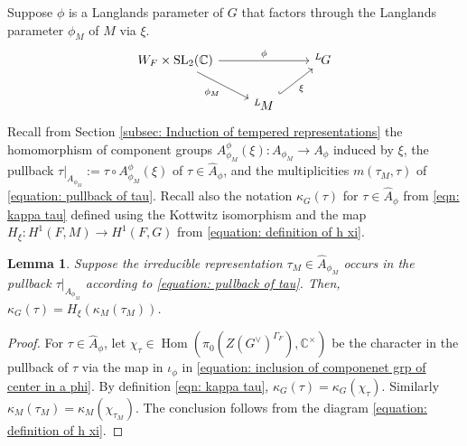 \documentclass[11pt,letterpaper]{amsart}
\newcommand{\BC}{\mathbb{C}}
\newcommand{\SL}{\mathrm{SL}}
\newcommand{\dualgroup}[1]{{#1}^\vee}
\newcommand{\irrepdual}[1]{\widehat{#1}}
\newcommand{\Lgroup}[1]{{\hskip-2 pt \,^L\hskip-1pt{#1}}}
\newcommand{\CC}{\mathbb{C}}
\newtheorem{lemma}[thm]{Lemma}
\DeclareMathOperator{\Hom}{Hom}
\renewcommand{\1}{\mathbbm{1}}
\numberwithin{equation}{section}
\begin{document}
{Suppose $\phi$ is a Langlands parameter of $G$ that factors through the Langlands parameter $\phi_{M}$ of $M$ via $\xi$.
\begin{equation} {\label{equation: setting L par factors}}%
\begin{tikzcd}
	{W_F\times \SL_2(\BC)} && {\Lgroup{G}} \\
	& {\Lgroup{M}}
	\arrow["\phi", from=1-1, to=1-3]
	\arrow["{\phi_M}"', from=1-1, to=2-2]
	\arrow["\xi"', hook, from=2-2, to=1-3]
\end{tikzcd}
\end{equation}
Recall from Section \ref{subsec: Induction of tempered representations} the homomorphism of component groups $A_{\phi_M}^\phi(\xi):A_{\phi_M}\to A_\phi$ induced by $\xi$, the pullback $\tau\vert_{A_{\phi_M}}:=\tau\circ A_{\phi_M}^\phi(\xi)$ of $\tau \in \irrepdual{A}_\phi$, and the multiplicities $m(\tau_M,\tau)$ of \eqref{equation: pullback of tau}.
Recall also the notation $\kappa_G(\tau)$ for $\tau \in \irrepdual{A}_\phi$ from \eqref{eqn: kappa tau} defined using the Kottwitz isomorphism and the map $H_\xi: H^1(F,M)\to H^1(F,G)$ from \eqref{equation: definition of h xi}. 
\begin{lemma}\label{lemma: relating galois colomology class of irreps of component groups}
     Suppose the irreducible representation $\tau_M\in \irrepdual{A}_{\phi_M}$ occurs in the pullback $\tau\vert_{A_{\phi_M}}$ according to \eqref{equation: pullback of tau}. Then, $\kappa_G(\tau)=H_\xi(\kappa_M(\tau_M))$.
\end{lemma}
\begin{proof}
    For $\tau \in \irrepdual{A}_\phi$, let $\chi_\tau \in \Hom(\pi_0(Z(\dualgroup{G})^{\Gamma_F}), \CC^\times)$ be the character in the pullback of $\tau$ via the map in $\iota_\phi$ in \eqref{equation: inclusion of componenet grp of center in a phi}. By definition \eqref{eqn: kappa tau}, $\kappa_G(\tau)=\kappa_G(\chi_\tau)$. Similarly $\kappa_M(\tau_M)=\kappa_M(\chi_{\tau_M})$. The conclusion follows from the diagram \eqref{equation: definition of h xi}.  
\end{proof}



}
\end{document}
